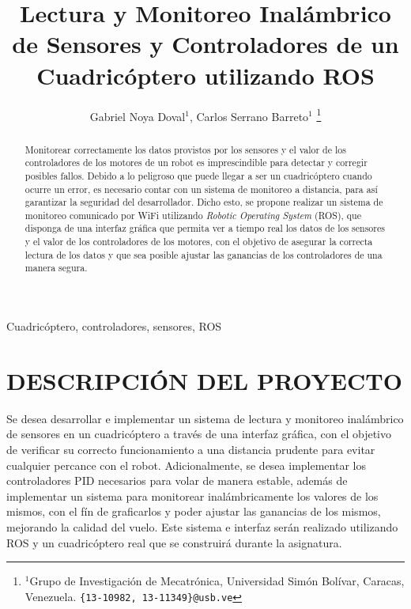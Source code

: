 \documentclass[letterpaper, 10 pt, conference]{ieeeconf}  %
\title{\LARGE \bf
Lectura y Monitoreo Inalámbrico de Sensores y Controladores de un Cuadricóptero utilizando ROS
}
\author{Gabriel Noya Doval$^{1}$, Carlos Serrano Barreto$^{1}$%
\thanks{$^{1}$Grupo de Investigación de Mecatrónica, Universidad Simón Bolívar, Caracas, Venezuela.
        {\tt\small \{13-10982, 13-11349\}@usb.ve}}%
}
\begin{document}
\maketitle
\thispagestyle{empty}
\pagestyle{empty}
\begin{abstract}

Monitorear correctamente los datos provistos por los sensores y el valor de los controladores de los motores de un robot es imprescindible para detectar y corregir posibles fallos. Debido a lo peligroso que puede llegar a ser un cuadricóptero cuando ocurre un error, es necesario contar con un sistema de monitoreo a distancia, para así garantizar la seguridad del desarrollador. Dicho esto, se propone realizar un sistema de monitoreo comunicado por WiFi utilizando \textit{Robotic Operating System} (ROS), que disponga de una interfaz gráfica que permita ver a tiempo real los datos de los sensores y el valor de los controladores de los motores, con el objetivo de asegurar la correcta lectura de los datos y que sea posible ajustar las ganancias de los controladores de una manera segura.
\\
\end{abstract}

\begin{keywords}
Cuadricóptero, controladores, sensores, ROS
\end{keywords}

\section{DESCRIPCIÓN DEL PROYECTO}
Se desea desarrollar e implementar un sistema de lectura y monitoreo inalámbrico de sensores en un cuadricóptero a través de una interfaz gráfica, con el objetivo de verificar su correcto funcionamiento a una distancia prudente para evitar cualquier percance con el robot. Adicionalmente, se desea implementar los controladores PID necesarios para volar de manera estable, además de implementar un sistema para monitorear inalámbricamente los valores de los mismos, con el fín de graficarlos y poder ajustar las ganancias de los mismos, mejorando la calidad del vuelo. Este sistema e interfaz serán realizado utilizando ROS y un cuadricóptero real que se construirá durante la asignatura.
\end{document}
